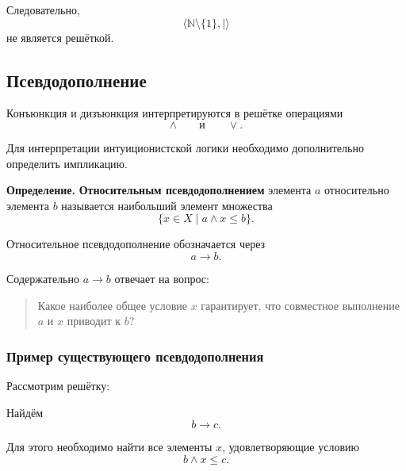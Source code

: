 \documentclass[12pt,a4paper,oneside,openany]{book}
\theoremstyle{definition}
\theoremstyle{plain}
\theoremstyle{remark}
\begin{document}
Следовательно,
\[
\langle\mathbb N\setminus\{1\},\mid\rangle
\]
не является решёткой.

\subsection{Псевдодополнение}

Конъюнкция и дизъюнкция интерпретируются в решётке операциями
\[
\wedge
\qquad\text{и}\qquad
\vee.
\]

Для интерпретации интуиционистской логики необходимо дополнительно
определить импликацию.

\textbf{Определение.}
\textbf{Относительным псевдодополнением} элемента \(a\) относительно
элемента \(b\) называется наибольший элемент множества
\[
\{x\in X\mid a\wedge x\leq b\}.
\]

Относительное псевдодополнение обозначается через
\[
a\to b.
\]


Содержательно \(a\to b\) отвечает на вопрос:

\begin{quote}
Какое наиболее общее условие \(x\) гарантирует, что совместное
выполнение \(a\) и \(x\) приводит к \(b\)?
\end{quote}

\subsubsection{Пример существующего псевдодополнения}

Рассмотрим решётку:

\begin{center}
\end{center}

Найдём
\[
b\to c.
\]

Для этого необходимо найти все элементы \(x\), удовлетворяющие
условию
\[
b\wedge x\leq c.
\]
\end{document}
